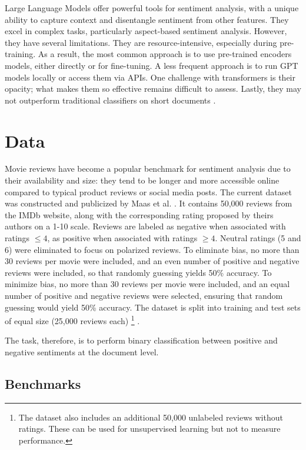 \documentclass{article}
\begin{document}
Large Language Models offer powerful tools for sentiment analysis, with a unique ability to capture context and disentangle sentiment from other features. They excel in complex tasks, particularly aspect-based sentiment analysis. However, they have several limitations. They are resource-intensive, especially during pre-training. As a result, the most common approach is to use pre-trained encoders models, either directly or for fine-tuning. A less frequent approach is to run GPT models locally or access them via APIs. One challenge with transformers is their opacity; what makes them so effective remains difficult to assess. Lastly, they may not outperform traditional classifiers on short documents \citep{ghatora_sentiment_2024}.


\section{Data}

Movie reviews have become a popular benchmark for sentiment analysis due to their availability and size: they tend to be longer and more accessible online compared to typical product reviews or social media posts. The current dataset was constructed and publicized by Maas et al. \citep{maas_learning_2011}. It contains 50,000 reviews from the IMDb website, along with the corresponding rating proposed by theirs authors on a 1-10 scale. Reviews are labeled as negative when associated with ratings \( \leq 4 \), as positive when associated with ratings \( \geq 4 \). Neutral ratings (5 and 6) were eliminated to focus on polarized reviews. To eliminate bias, no more than 30 reviews per movie were included, and an even number of positive and negative reviews were included, so that randomly guessing yields 50\% accuracy. To minimize bias, no more than 30 reviews per movie were included, and an equal number of positive and negative reviews were selected, ensuring that random guessing would yield 50\% accuracy. The dataset is split into training and test sets of equal size (25,000 reviews each) 
\footnote{The dataset also includes an additional 50,000 unlabeled reviews without ratings. These can be used for unsupervised learning but not to measure performance.}
.

The task, therefore, is to perform binary classification between positive and negative sentiments at the document level.

\subsection{Benchmarks}
\end{document}
